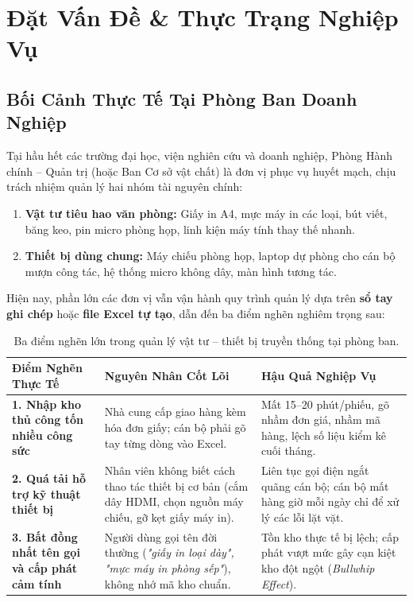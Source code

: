 \documentclass[11pt,a4paper]{article}
\begin{document}
\section{Đặt Vấn Đề \& Thực Trạng Nghiệp Vụ}

\subsection{Bối Cảnh Thực Tế Tại Phòng Ban Doanh Nghiệp}
Tại hầu hết các trường đại học, viện nghiên cứu và doanh nghiệp, Phòng Hành chính -- Quản trị (hoặc Ban Cơ sở vật chất) là đơn vị phục vụ huyết mạch, chịu trách nhiệm quản lý hai nhóm tài nguyên chính:
\begin{enumerate}[leftmargin=1.5em]
    \item \textbf{Vật tư tiêu hao văn phòng:} Giấy in A4, mực máy in các loại, bút viết, băng keo, pin micro phòng họp, linh kiện máy tính thay thế nhanh.
    \item \textbf{Thiết bị dùng chung:} Máy chiếu phòng họp, laptop dự phòng cho cán bộ mượn công tác, hệ thống micro không dây, màn hình tương tác.
\end{enumerate}

Hiện nay, phần lớn các đơn vị vẫn vận hành quy trình quản lý dựa trên \textbf{sổ tay ghi chép} hoặc \textbf{file Excel tự tạo}, dẫn đến ba điểm nghẽn nghiêm trọng sau:

\begin{table}[H]
\centering
\small
\renewcommand{\arraystretch}{1.25}
\begin{tabularx}{\textwidth}{p{3.8cm} p{5.5cm} >{\raggedright\arraybackslash}X}
\toprule
\textbf{Điểm Nghẽn Thực Tế} & \textbf{Nguyên Nhân Cốt Lõi} & \textbf{Hậu Quả Nghiệp Vụ} \\
\midrule
\textbf{1. Nhập kho thủ công tốn nhiều công sức} & Nhà cung cấp giao hàng kèm hóa đơn giấy; cán bộ phải gõ tay từng dòng vào Excel. & Mất 15--20 phút/phiếu, gõ nhầm đơn giá, nhầm mã hàng, lệch số liệu kiểm kê cuối tháng. \\
\addlinespace
\textbf{2. Quá tải hỗ trợ kỹ thuật thiết bị} & Nhân viên không biết cách thao tác thiết bị cơ bản (cắm dây HDMI, chọn nguồn máy chiếu, gỡ kẹt giấy máy in). & Liên tục gọi điện ngắt quãng cán bộ; cán bộ mất hàng giờ mỗi ngày chỉ để xử lý các lỗi lặt vặt. \\
\addlinespace
\textbf{3. Bất đồng nhất tên gọi và cấp phát cảm tính} & Người dùng gọi tên đời thường (\textit{"giấy in loại dày", "mực máy in phòng sếp"}), không nhớ mã kho chuẩn. & Tồn kho thực tế bị lệch; cấp phát vượt mức gây cạn kiệt kho đột ngột (\textit{Bullwhip Effect}). \\
\bottomrule
\end{tabularx}
\caption{Ba điểm nghẽn lớn trong quản lý vật tư -- thiết bị truyền thống tại phòng ban.}
\end{table}
\end{document}

